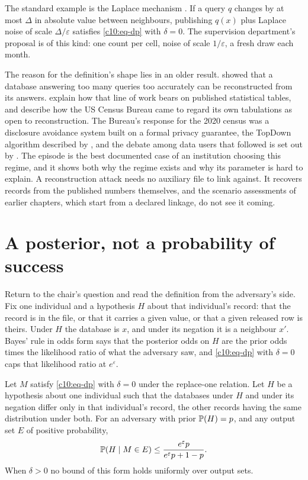 The standard example is the Laplace mechanism \citep{dwork2006b}. If a query $q$
changes by at most $\Delta$ in absolute value between neighbours, publishing
$q(x)$ plus Laplace noise of scale $\Delta/\varepsilon$ satisfies
\eqref{c10:eq-dp} with $\delta = 0$. The supervision department's proposal is of
this kind: one count per cell, noise of scale $1/\varepsilon$, a fresh draw each
month.

The reason for the definition's shape lies in an older result. \citet{dinur2003}
showed that a database answering too many queries too accurately can be
reconstructed from its answers. \citet{garfinkel2019} explain how that line of
work bears on published statistical tables, and describe how the US Census Bureau
came to regard its own tabulations as open to reconstruction. The Bureau's
response for the 2020 census was a disclosure avoidance system built on a formal
privacy guarantee, the TopDown algorithm described by \citet{abowd2022}, and the
debate among data users that followed is set out by \citet{hotz2022}. The episode
is the best documented case of an institution choosing this regime, and it shows
both why the regime exists and why its parameter is hard to explain. A
reconstruction attack needs no auxiliary file to link against. It recovers
records from the published numbers themselves, and the scenario assessments of
earlier chapters, which start from a declared linkage, do not see it coming.

\section{A posterior, not a probability of success}\label{c10:sec-posterior}

Return to the chair's question and read the definition from the adversary's side.
Fix one individual and a hypothesis $H$ about that individual's record: that the
record is in the file, or that it carries a given value, or that a given released
row is theirs. Under $H$ the database is $x$, and under its negation it is a
neighbour $x'$. Bayes' rule in odds form says that the posterior odds on $H$ are
the prior odds times the likelihood ratio of what the adversary saw, and
\eqref{c10:eq-dp} with $\delta = 0$ caps that likelihood ratio at $e^\varepsilon$.

\begin{proposition}\label{c10:prop-post}
Let $M$ satisfy \eqref{c10:eq-dp} with $\delta = 0$ under the replace-one relation.
Let $H$ be a hypothesis about one individual such that the databases under $H$ and
under its negation differ only in that individual's record, the other records
having the same distribution under both. For an adversary with prior
$\mathbb{P}(H) = p$, and any output set $E$ of positive probability,
\begin{equation}\label{c10:eq-post}
\mathbb{P}(H \mid M \in E) \le \frac{e^{\varepsilon} p}{e^{\varepsilon} p + 1 - p}.
\end{equation}
When $\delta > 0$ no bound of this form holds uniformly over output sets.
\end{proposition}

